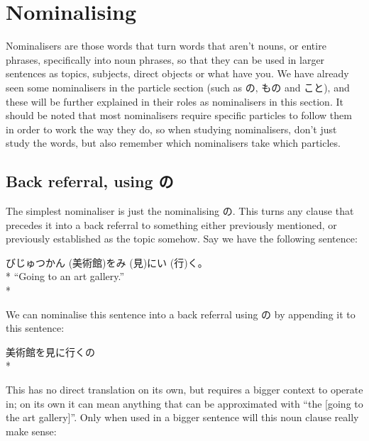 \documentclass[11pt, b5paper, twoside, openright, onecolumn]{book}
\makeatletter
\newcommand*{\rubystack}[2]{{\relscale{0.5}%
  \begin{tabular}[b]{@{}c@{}}%
    {#1}\\%
   {\textscale{2}{#2}}%
  \end{tabular}}%
}
\DeclareRobustCommand*{\ruby}[2]{%
  \mbox{%
    \setlength{\parskip}{0ex}%
    \BeginAccSupp{method=pdfstringdef,ActualText={#1}}%
      \rubystack{\phantom{#2}}{#1}%
      \llap{%
        \rubystack{#2}{\phantom{#1}}%
      }%
    \EndAccSupp{}%
  }%
}
\renewcommand*{\ruby}[2]{#2 (#1)}%
\newenvironment{exampleblock}{
\setlength{\parindent}{0.6in}
\begin{minipage}[t]{\dimexpr\textwidth-\parindent}}
{\end{minipage}}
\makeatother
\begin{document}
\section{Nominalising}


Nominalisers are those words that turn words that aren’t nouns‚ or entire phrases‚ specifically into noun phrases‚ so that they can be used in larger sentences as topics‚ subjects‚ direct objects or what have you. We have already seen some nominalisers in the particle section (such as の‚ もの and こと)‚ and these will be further explained in their roles as nominalisers in this section. It should be noted that most nominalisers require specific particles to follow them in order to work the way they do‚ so when studying nominalisers‚ don’t just study the words‚ but also remember which nominalisers take which particles.

\subsection{Back referral‚ using の}

The simplest nominaliser is just the nominalising の. This turns any clause that precedes it into a back referral to something either previously mentioned‚ or previously established as the topic somehow. Say we have the following sentence:

\vspace{0.4cm}
\begin{exampleblock}
\ruby{美術館}{びじゅつかん}を\ruby{見}{み}に\ruby{行}{い}く。 \\* 
“Going to an art gallery.” \\* 
\end{exampleblock}
\vspace{0.2cm}

We can nominalise this sentence into a back referral using の by appending it to this sentence:

\vspace{0.4cm}
\begin{exampleblock}
美術館を見に行くの \\* 
\end{exampleblock}
\vspace{0.2cm}

This has no direct translation on its own‚ but requires a bigger context to operate in; on its own it can mean anything that can be approximated with “the [going to the art gallery]”. Only when used in a bigger sentence will this noun clause really make sense:
\end{document}
